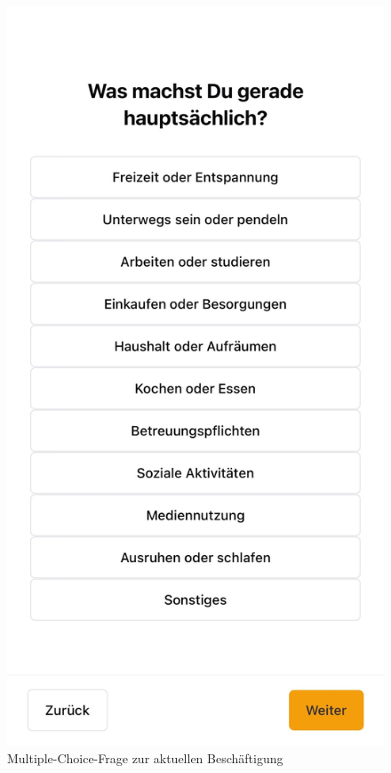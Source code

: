 \begin{figure}[h]
    \centering
    \begin{minipage}[t]{0.38\textwidth}
        \centering
        \includegraphics[width=\textwidth]{Arbeit/images/printscreens/beschaeftigung.jpeg}
        \caption{Multiple-Choice-Frage zur aktuellen Beschäftigung}

\end{minipage}
\end{figure}
